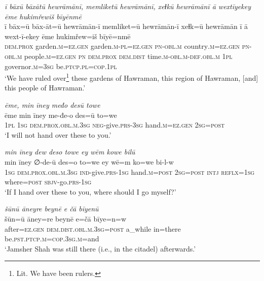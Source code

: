 \ea \label{DP.21}
\textit{ī bāxū bāxātū hewrāmānī, memliketū hewrāmānī, xeɫkū hewrāmānī ā wextīyekey ēme hukimřewiš bīyēnmē} \\ 
\gll ī bāx=ū bāx-āt=ū hewrāmān-ī memliket=ū hewrāmān-ī xeɫk=ū hewrāmān ī ā wext-ī-ekey ēme hukimřew=iš bīyē=nmē \\ 
 \textsc{dem.prox} garden\textsc{.m}\textsc{=ez}\textsc{.gen} garden\textsc{.m}\textsc{-pl}\textsc{=ez}\textsc{.gen} \textsc{pn}\textsc{-obl}\textsc{.m} country\textsc{.m}\textsc{=ez}\textsc{.gen} \textsc{pn}\textsc{-obl}\textsc{.m} people\textsc{.m}\textsc{=ez}\textsc{.gen} \textsc{pn} \textsc{dem.prox} \textsc{dem.dist} time\textsc{.m}\textsc{-obl}\textsc{.m}\textsc{-def}\textsc{.obl}\textsc{.m} \textsc{1pl} governor\textsc{.m}\textsc{=3sg} be\textsc{.ptcp}\textsc{.pl}\textsc{=cop}\textsc{.1pl} \\ 
\glt `We have ruled over\footnote{Lit. We have been rulers.} these gardens of Hawraman, this region of Hawraman, [and] this people of Hawraman.'
\z 
 
\ea \label{DP.22}
\textit{ēme, min īney međo desū towe} \\ 
\gll ēme min īney me-đe-o des=ū to=we \\ 
 \textsc{1pl} \textsc{1sg} \textsc{dem.prox}\textsc{.obl}\textsc{.m}\textsc{.3sg} \textsc{neg-}give\textsc{.prs}\textsc{-3sg} hand\textsc{.m}\textsc{=ez}\textsc{.gen} \textsc{2sg}\textsc{=\textsc{post}} \\ 
\glt `I will not hand over these to you.'
\z 
 
\ea \label{DP.23}
\textit{min īney dew deso towe ey wēm kowe bilū} \\ 
\gll min īney ∅-de-ū des=o to=we ey wē=m ko=we bi-l-w \\ 
 \textsc{1sg} \textsc{dem.prox}\textsc{.obl}\textsc{.m}\textsc{.3sg} \textsc{ind-}give\textsc{.prs}\textsc{-1sg} hand\textsc{.m}\textsc{=\textsc{post}} \textsc{2sg}\textsc{=\textsc{post}} \textsc{intj} \textsc{reflx}\textsc{=1sg} where\textsc{=\textsc{post}} \textsc{sbjv-}go\textsc{.prs}\textsc{-1sg} \\ 
\glt `If I hand over these to you, where should I go myself?'
\z 
 
\ea \label{DP.25}
\textit{šūnū āneyre beynē e čā bīyenū} \\ 
\gll šūn=ū āney=re beynē e=čā bīye=n=w \\ 
 after\textsc{=ez}\textsc{.gen} \textsc{dem.dist}\textsc{.obl}\textsc{.m}\textsc{.3sg}\textsc{=\textsc{post}} a\_while in=there be\textsc{.pst}\textsc{.ptcp}\textsc{.m}\textsc{=cop}\textsc{.3sg}\textsc{.m}=and \\ 
\glt `Jamsher Shah was still there (i.e., in the citadel) afterwards.'
\z 
 
